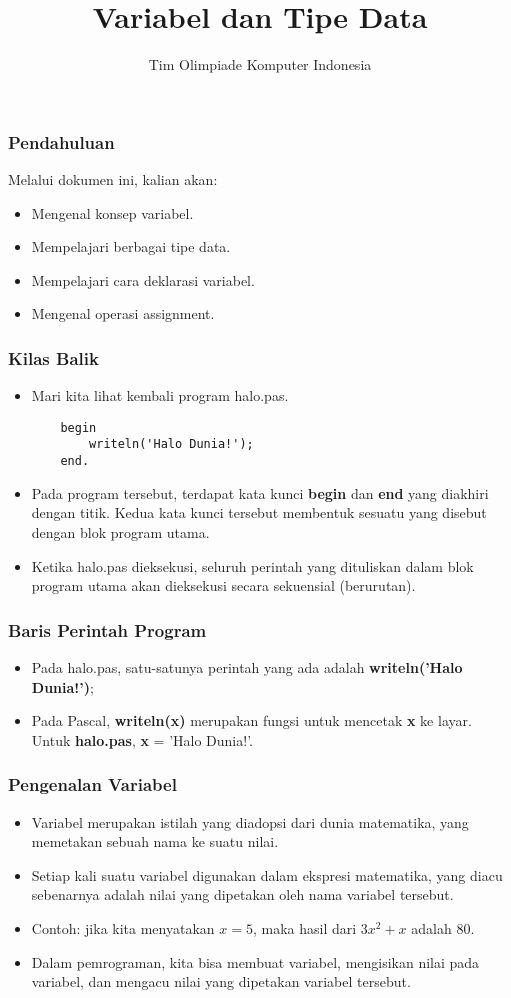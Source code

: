 \documentclass{beamer}
\title{Variabel dan Tipe Data}
\author{Tim Olimpiade Komputer Indonesia}
\begin{document}
\begin{frame}
\titlepage
\end{frame}

\begin{frame}
\frametitle{Pendahuluan}
Melalui dokumen ini, kalian akan:
\begin{itemize}
	\item Mengenal konsep variabel.
	\item Mempelajari berbagai tipe data.
	\item Mempelajari cara deklarasi variabel.
	\item Mengenal operasi assignment.
\end{itemize}
\end{frame}

\begin{frame}[fragile]
\frametitle{Kilas Balik}
\begin{itemize}
	\item Mari kita lihat kembali program halo.pas.
	\begin{lstlisting}
	begin
	    writeln('Halo Dunia!');
	end.
	\end{lstlisting}
	\item Pada program tersebut, terdapat kata kunci \textbf{begin} dan \textbf{end} yang diakhiri dengan titik. Kedua kata kunci tersebut membentuk sesuatu yang disebut dengan blok program utama.
	\item Ketika halo.pas dieksekusi, seluruh perintah yang dituliskan dalam blok program utama akan dieksekusi secara sekuensial (berurutan).
\end{itemize}
\end{frame}

\begin{frame}
\frametitle{Baris Perintah Program}
\begin{itemize}
	\item Pada halo.pas, satu-satunya perintah yang ada adalah \textbf{writeln('Halo Dunia!')};
	\item Pada Pascal, \textbf{writeln(x)} merupakan fungsi untuk mencetak \textbf{x} ke layar. Untuk \textbf{halo.pas}, \textbf{x} = 'Halo Dunia!'.
\end{itemize}
\end{frame}

\begin{frame}
\frametitle{Pengenalan Variabel}
\begin{itemize}
	\item Variabel merupakan istilah yang diadopsi dari dunia matematika, yang memetakan sebuah nama ke suatu nilai.
	\item Setiap kali suatu variabel digunakan dalam ekspresi matematika, yang diacu sebenarnya adalah nilai yang dipetakan oleh nama variabel tersebut.
	\item Contoh: jika kita menyatakan $x=5$, maka hasil dari $3x^2 + x$ adalah $80$.
	\item Dalam pemrograman, kita bisa membuat variabel, mengisikan nilai pada variabel, dan mengacu nilai yang dipetakan variabel tersebut.
\end{itemize}
\end{frame}
\end{document}
